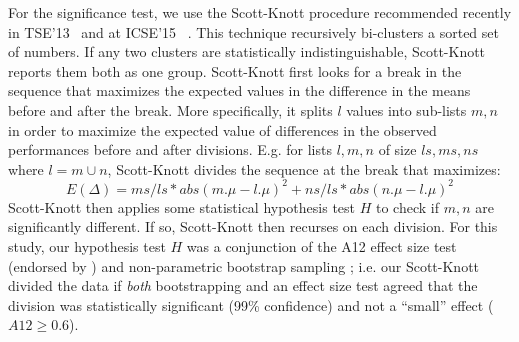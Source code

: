 \documentclass[10pt,conference]{IEEEtran}
\theoremstyle{break}
\theoremstyle{break}
\begin{document}
For the significance test,  we use the 
     Scott-Knott procedure  recommended  recently in TSE'13~\cite{mittas13} and at ICSE'15~\cite{ghotra2015revisiting} . This
     technique recursively bi-clusters a sorted
    set of numbers. If any two clusters are statistically indistinguishable, Scott-Knott
    reports them both as one group.
    Scott-Knott first looks for a break in the sequence that maximizes the expected
    values in the difference in the means before and after the break.
    More specifically,  it  splits $l$ values into sub-lists $m, n$ in order to maximize the expected value of differences  in the observed performances before and after divisions. E.g. for lists $l,m, n$ of size $ls,ms, ns$ where $l=m\cup n$, Scott-Knott divides the sequence at the break that maximizes:
     \[E(\Delta)=ms/ls*abs(m.\mu - l.\mu)^2 + ns/ls*abs(n.\mu - l.\mu)^2\]
Scott-Knott then applies some statistical hypothesis test $H$ to check if $m, n$ are significantly different. If so, Scott-Knott then recurses on each division.
    For this study, our hypothesis test $H$ was a conjunction of the A12 effect size test (endorsed by
    \cite{arcuri11})  and non-parametric bootstrap sampling \cite{efron94}; i.e. our Scott-Knott divided the data if {\em both}
    bootstrapping and an effect size test agreed that the division was statistically significant (99\% confidence) and not a ``small'' effect ($A12 \ge 0.6$).




\end{document}
